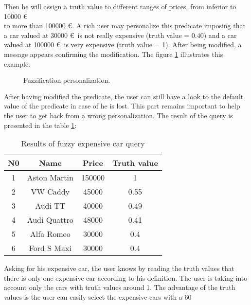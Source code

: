\documentclass[a4paper,twoside]{article}
\begin{document}
Then he will assign a truth value to different ranges of prices, from inferior to 10000 \euro\\  to more than 100000 \euro . A rich user may personalize this predicate imposing that a car valued at 30000 \euro\  is not really expensive (truth value = 0.40) and a car valued at 100000 \euro\  is very expensive (truth value = 1). After being modified, a message appears confirming the modification. The figure \ref{fig:fuzzypers} illustrates this example. \\

\begin{figure}[!h]
  \centering
   {}
  \caption{Fuzzification personalization.}
  \label{fig:fuzzypers}
 \end{figure}

After having modified the predicate, the user can still have a look to the default value of the predicate in case of he is lost. This part remains important to help the user to get back from a wrong personalization. The result of the query is presented in the table \ref{tab:solveQuery1}:  \\ 

\begin{table}[h]
\caption{Results of fuzzy expensive car query}\label{tab:solveQuery1} \centering
\begin{tabular}{|c|c|c|c|}
  \hline
  N0 & Name & Price & Truth value\\
  \hline
  1 & Aston Martin & 150000 & 1 \\
  \hline
  2 & VW Caddy & 45000 & 0.55\\
  \hline
  3 & Audi TT & 40000 & 0.49 \\
  \hline
  4 & Audi Quattro & 48000 & 0.41 \\ 
  \hline
  5 & Alfa Romeo & 30000 & 0.4 \\
  \hline
  6 & Ford S Maxi & 30000 & 0.4 \\
  \hline
\end{tabular}
\end{table}


Asking for his expensive car, the user knows by reading the truth values that there is only one expensive car according to his definition. The user is taking into account only the cars with truth values around 1. The advantage of the truth values is the user can easily select the expensive cars with a 60%
\end{document}
